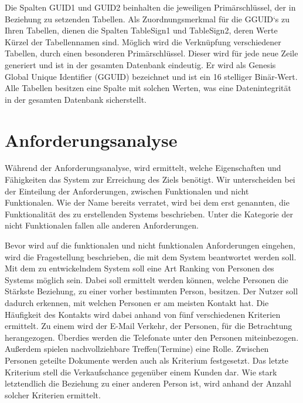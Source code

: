 Die Spalten GUID1 und GUID2 beinhalten die jeweiligen Primärschlüssel, der in Beziehung zu setzenden Tabellen. Als Zuordnungsmerkmal für die GGUID`s zu Ihren Tabellen, dienen die Spalten TableSign1 und TableSign2, deren Werte Kürzel der Tabellennamen sind. Möglich wird die Verknüpfung verschiedener Tabellen, durch einen besonderen Primärschlüssel. Dieser wird für jede neue Zeile generiert und ist in der gesamten Datenbank eindeutig. Er wird als Genesis Global Unique Identifier (GGUID) bezeichnet und ist ein 16 stelliger Binär-Wert. Alle Tabellen besitzen eine Spalte mit solchen Werten, was eine Datenintegrität in der gesamten Datenbank sicherstellt.

\section{Anforderungsanalyse}
\label{ch:Systemanalyse:sec:Anforderungsanalyse}

Während der Anforderungsanalyse, wird ermittelt, welche Eigenschaften und Fähigkeiten das System zur Erreichung des Ziels benötigt. Wir unterscheiden bei der Einteilung der Anforderungen, zwischen Funktionalen und nicht Funktionalen. Wie der Name bereits verratet, wird bei dem erst genannten, die Funktionalität des zu erstellenden Systems beschrieben. Unter die Kategorie der nicht Funktionalen fallen alle anderen Anforderungen. 

Bevor wird auf die funktionalen und nicht funktionalen Anforderungen eingehen, wird die Fragestellung beschrieben, die mit dem System beantwortet werden soll. Mit dem zu entwickelndem System soll eine Art Ranking von Personen des Systems möglich sein. Dabei soll ermittelt werden können, welche Personen die Stärkste Beziehung, zu einer vorher bestimmten Person, besitzen. Der Nutzer soll dadurch erkennen, mit welchen Personen er am meisten Kontakt hat. Die Häufigkeit des Kontakts wird dabei anhand von fünf verschiedenen Kriterien ermittelt. Zu einem wird der E-Mail Verkehr, der Personen, für die Betrachtung herangezogen. Überdies werden die Telefonate unter den Personen miteinbezogen. Außerdem spielen nachvollziehbare Treffen(Termine) eine Rolle. Zwischen Personen geteilte Dokumente werden auch als Kriterium festgesetzt. Das letzte Kriterium stell die Verkaufschance gegenüber einem Kunden dar. Wie stark letztendlich die Beziehung zu einer anderen Person ist, wird anhand der Anzahl solcher Kriterien ermittelt.  

